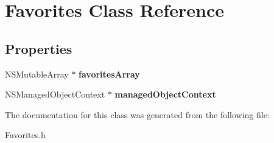 \hypertarget{interface_favorites}{
\section{Favorites Class Reference}
\label{interface_favorites}
}
\subsection*{Properties}
\begin{DoxyCompactItemize}
\item 
\hypertarget{interface_favorites_a005d917777c13bde5d885f57bb2dd48b}{
NSMutableArray $\ast$ {\bfseries favoritesArray}}
\label{interface_favorites_a005d917777c13bde5d885f57bb2dd48b}

\item 
\hypertarget{interface_favorites_adaa5934895504c643e5c7f9a8b12d28c}{
NSManagedObjectContext $\ast$ {\bfseries managedObjectContext}}
\label{interface_favorites_adaa5934895504c643e5c7f9a8b12d28c}

\end{DoxyCompactItemize}


The documentation for this class was generated from the following file:\begin{DoxyCompactItemize}
\item 
Favorites.h\end{DoxyCompactItemize}
